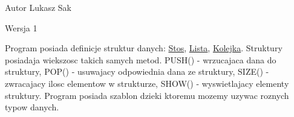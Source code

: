 \begin{DoxyAuthor}{Autor}
Lukasz Sak 
\end{DoxyAuthor}
\begin{DoxyVersion}{Wersja}
1
\end{DoxyVersion}
Program posiada definicje struktur danych: \hyperlink{class_stos}{Stos}, \hyperlink{class_lista}{Lista}, \hyperlink{class_kolejka}{Kolejka}. Struktury posiadaja wiekszosc takich samych metod. PUSH() -\/ wrzucajaca dana do struktury, POP() -\/ usuwajacy odpowiednia dana ze struktury, SIZE() -\/ zwracajacy ilosc elementow w strukturze, SHOW() -\/ wyswietlajacy elementy struktury. Program posiada szablon dzieki ktoremu mozemy uzywac roznych typow danych. 